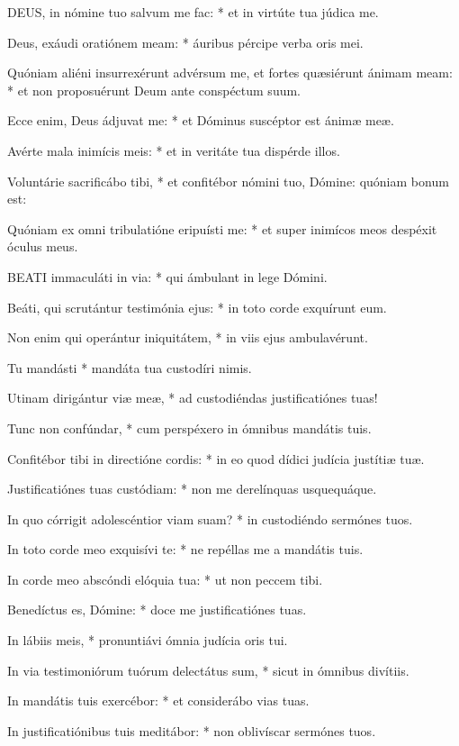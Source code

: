 
\lettrine[lines=2]{D}{EUS}, in nómine tuo salvum me fac: * et in virtúte tua júdica me.

Deus, exáudi oratiónem meam: * áuribus pércipe verba oris mei.

Quóniam aliéni insurrexérunt advérsum me, et fortes quæsiérunt ánimam meam: * et non proposuérunt Deum ante conspéctum suum.

Ecce enim, Deus ádjuvat me: * et Dóminus suscéptor est ánimæ meæ.

Avérte mala inimícis meis: * et in veritáte tua dispérde illos.

Voluntárie sacrificábo tibi, * et confitébor nómini tuo, Dómine: quóniam bonum est:

Quóniam ex omni tribulatióne eripuísti me: * et super inimícos meos despéxit óculus meus.


\lettrine[lines=2]{B}{EATI} immaculáti in via: * qui ámbulant in lege Dómini.

Beáti, qui scrutántur testimónia ejus: * in toto corde exquírunt eum.

Non enim qui operántur iniquitátem, * in viis ejus ambulavérunt.

Tu mandásti * mandáta tua custodíri nimis.

Utinam dirigántur viæ meæ, * ad custodiéndas justificatiónes tuas!

Tunc non confúndar, * cum perspéxero in ómnibus mandátis tuis.

Confitébor tibi in directióne cordis: * in eo quod dídici judícia justítiæ tuæ.

Justificatiónes tuas custódiam: * non me derelínquas usquequáque.

In quo córrigit adolescéntior viam suam? * in custodiéndo sermónes tuos.

In toto corde meo exquisívi te: * ne repéllas me a mandátis tuis.

In corde meo abscóndi elóquia tua: * ut non peccem tibi.

Benedíctus es, Dómine: * doce me justificatiónes tuas.

In lábiis meis, * pronuntiávi ómnia judícia oris tui.

In via testimoniórum tuórum delectátus sum, * sicut in ómnibus divítiis.

In mandátis tuis exercébor: * et considerábo vias tuas.

In justificatiónibus tuis meditábor: * non oblivíscar sermónes tuos.

